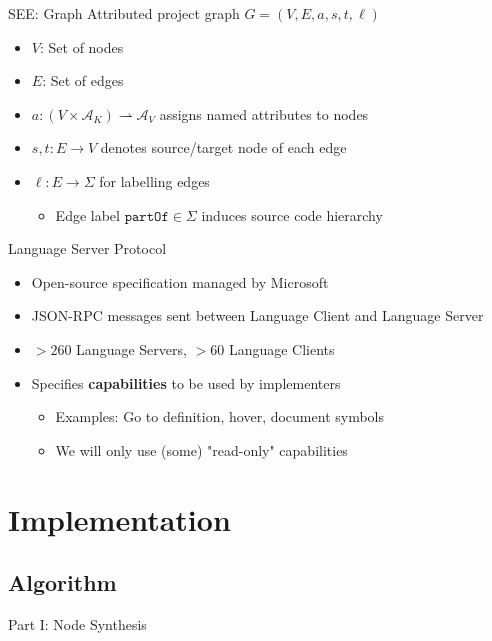 \documentclass[xcolor={dvipsnames},aspectratio=169,compress]{beamer} %
\begin{document}
\begin{frame}{SEE: Graph}
	Attributed project graph $G = (V, E, a, s, t, \ell)$

	\begin{itemize}
		\item $V$: Set of nodes
		\item $E$: Set of edges
		\item $a: (V \times \mathcal{A}_K) \rightharpoonup \mathcal{A}_V$ assigns named attributes to nodes
		\item $s, t: E \rightarrow V$ denotes source/target node of each edge
		\item $\ell: E \rightarrow \Sigma$ for labelling edges
		      \begin{itemize}
			      \item Edge label $\texttt{partOf} \in \Sigma$ induces source code hierarchy
		      \end{itemize}
	\end{itemize}
\end{frame}

\begin{frame}{Language Server Protocol}
	\begin{itemize}
		\item Open-source specification managed by Microsoft
		\item JSON-RPC messages sent between Language Client and Language Server
		\item $>260$ Language Servers, $>60$ Language Clients
		\item Specifies \textbf{capabilities} to be used by implementers
		      \begin{itemize}
			      \item Examples: Go to definition, hover, document symbols
			      \item We will only use (some) "read-only" capabilities
		      \end{itemize}
	\end{itemize}
\end{frame}
%

\section{Implementation}

\subsection{Algorithm}

\begin{frame}{Part I: Node Synthesis}
\end{frame}
\end{document}
